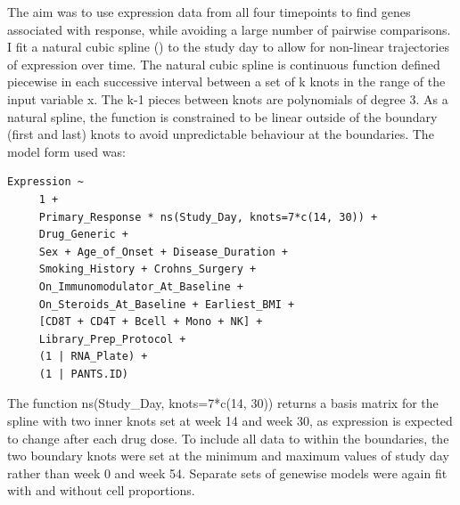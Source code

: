 \begin{outline}
The aim was to use expression data from all four timepoints to find genes associated with response,
while avoiding a large number of pairwise comparisons.
I fit a natural cubic spline () to the study day to allow for non-linear trajectories of expression over time.
The natural cubic spline is continuous function defined piecewise in each successive interval between a set of k knots in the range of the input variable x.
The k-1 pieces between knots are polynomials of degree 3. 
As a natural spline, the function is constrained to be linear outside of the boundary (first and last) knots to avoid unpredictable behaviour at the boundaries.
The model form used was:

\begin{lstlisting}
Expression ~
     1 +
     Primary_Response * ns(Study_Day, knots=7*c(14, 30)) + 
     Drug_Generic + 
     Sex + Age_of_Onset + Disease_Duration +
     Smoking_History + Crohns_Surgery +
     On_Immunomodulator_At_Baseline + 
     On_Steroids_At_Baseline + Earliest_BMI +
     [CD8T + CD4T + Bcell + Mono + NK] +
     Library_Prep_Protocol +
     (1 | RNA_Plate) +
     (1 | PANTS.ID)
\end{lstlisting}

The function ns(Study\_Day, knots=7*c(14, 30)) returns a basis matrix for the spline
with two inner knots set at week 14 and week 30, as expression is expected to change after each drug dose.
To include all data to within the boundaries, the two boundary knots were set at the minimum and maximum values of study day rather than week 0 and week 54.
Separate sets of genewise models were again fit with and without cell proportions.


\end{outline}
